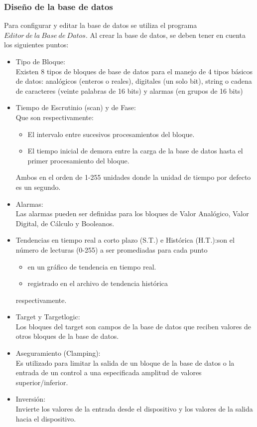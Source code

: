 \subsubsection{Diseño de la base de datos}
Para configurar y editar la base de datos se utiliza el programa $Editor~de~la~Base~de~Datos$.
Al crear la base de datos, se deben tener en cuenta los siguientes puntos:
\begin{itemize}
 \item Tipo de Bloque:\\Existen 8 tipos de bloques de base de datos para el
manejo de 4 tipos básicos de datos: analógicos (enteros o reales), digitales (un
solo bit), string o cadena de caracteres (veinte palabras de 16 bits) y
alarmas (en grupos de 16 bits)
\item Tiempo de Escrutinio (scan) y de Fase:\\Que son respectivamente:
  \begin{itemize}
  \item El intervalo entre sucesivos procesamientos del bloque.
  \item El tiempo inicial de demora entre la carga de la base de datos hasta el primer
  procesamiento del bloque.
  \end{itemize}
  Ambos en el orden de 1-255 unidades donde la unidad de tiempo por defecto es un segundo.
\item Alarmas:\\Las alarmas pueden ser definidas para los bloques de Valor Analógico, Valor
Digital, de Cálculo y Booleanos.
\item Tendencias en tiempo real a corto plazo (S.T.) e Histórica (H.T.):son el número de lecturas 
  (0-255) a ser promediadas para cada punto 
  \begin{itemize}
  \item en un gráfico de tendencia en tiempo real.
  \item registrado en el archivo de tendencia histórica
  \end{itemize}
  respectivamente.
\item Target y Targetlogic:\\Los bloques del target son campos de la base de datos que reciben valores de
otros bloques de la base de datos.
\item Aseguramiento (Clamping):\\Es utilizado para limitar la salida de un bloque de la base de datos o
la entrada de un control a una especificada amplitud de valores superior/inferior.
\item Inversión:\\ Invierte los valores de la entrada desde el dispositivo y los
valores de la salida hacia el dispositivo.
\end{itemize}

